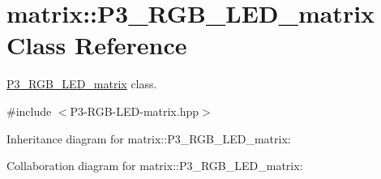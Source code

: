\hypertarget{classmatrix_1_1P3__RGB__LED__matrix}{}\section{matrix\+:\+:P3\+\_\+\+R\+G\+B\+\_\+\+L\+E\+D\+\_\+matrix Class Reference}
\label{classmatrix_1_1P3__RGB__LED__matrix}


\hyperlink{classmatrix_1_1P3__RGB__LED__matrix}{P3\+\_\+\+R\+G\+B\+\_\+\+L\+E\+D\+\_\+matrix} class.  




{\ttfamily \#include $<$P3-\/\+R\+G\+B-\/\+L\+E\+D-\/matrix.\+hpp$>$}



Inheritance diagram for matrix\+:\+:P3\+\_\+\+R\+G\+B\+\_\+\+L\+E\+D\+\_\+matrix\+:


Collaboration diagram for matrix\+:\+:P3\+\_\+\+R\+G\+B\+\_\+\+L\+E\+D\+\_\+matrix\+:
